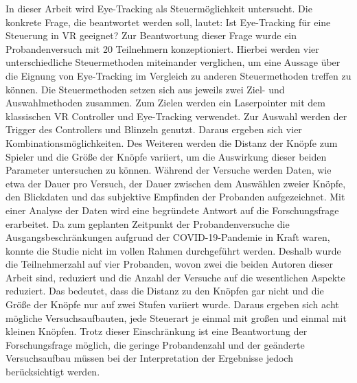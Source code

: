 \clearpage
In dieser Arbeit wird Eye-Tracking als Steuermöglichkeit untersucht. Die konkrete Frage, die beantwortet werden soll, lautet: \glqq Ist Eye-Tracking für eine Steuerung in \ac{VR} geeignet?\grqq{} Zur Beantwortung dieser Frage wurde ein Probandenversuch mit 20 Teilnehmern konzeptioniert. Hierbei werden vier unterschiedliche Steuermethoden miteinander verglichen, um eine Aussage über die Eignung von Eye-Tracking im Vergleich zu anderen Steuermethoden treffen zu können. Die Steuermethoden setzen sich aus jeweils zwei Ziel- und Auswahlmethoden zusammen. Zum Zielen werden ein Laserpointer mit dem klassischen \ac{VR} Controller und Eye-Tracking verwendet. Zur Auswahl werden der Trigger des Controllers und Blinzeln genutzt. Daraus ergeben sich vier Kombinationsmöglichkeiten. Des Weiteren werden die Distanz der Knöpfe zum Spieler und die Größe der Knöpfe variiert, um die Auswirkung dieser beiden Parameter untersuchen zu können. Während der Versuche werden Daten, wie etwa der Dauer pro Versuch, der Dauer zwischen dem Auswählen zweier Knöpfe, den Blickdaten und das subjektive Empfinden der Probanden aufgezeichnet. Mit einer Analyse der Daten wird eine begründete Antwort auf die Forschungsfrage erarbeitet. Da zum geplanten Zeitpunkt der Probandenversuche die Ausgangsbeschränkungen aufgrund der \ac{COVID-19}-Pandemie in Kraft waren, konnte die Studie nicht im vollen Rahmen durchgeführt werden. Deshalb wurde die Teilnehmerzahl auf vier Probanden, wovon zwei die beiden Autoren dieser Arbeit sind, reduziert und die Anzahl der Versuche auf die wesentlichen Aspekte reduziert. Das bedeutet, dass die Distanz zu den Knöpfen gar nicht und die Größe der Knöpfe nur auf zwei Stufen variiert wurde. Daraus ergeben sich acht mögliche Versuchsaufbauten, jede Steuerart je einmal mit großen und einmal mit kleinen Knöpfen. Trotz dieser Einschränkung ist eine Beantwortung der Forschungsfrage möglich, die geringe Probandenzahl und der geänderte Versuchsaufbau müssen bei der Interpretation der Ergebnisse jedoch berücksichtigt werden. 

